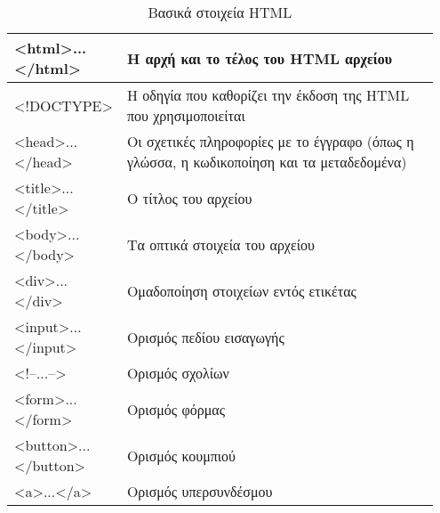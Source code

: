 \begin{table}[h]
\caption{Βασικά στοιχεία HTML}
\label{tbl:html_basic_elements}
\begin{tabular}{|p{0.2\linewidth}|p{0.75\linewidth}|}
\hline
\textless{}html\textgreater{}...\textless{}/html\textgreater{}     & Η αρχή και το τέλος του HTML αρχείου                                                      \\ \hline
\textless{}!DOCTYPE\textgreater{}                                  & Η οδηγία που καθορίζει την έκδοση της HTML που χρησιμοποιείται                            \\ \hline
\textless{}head\textgreater{}...\textless{}/head\textgreater{}     & Οι σχετικές πληροφορίες με το έγγραφο (όπως η γλώσσα, η κωδικοποίηση και τα μεταδεδομένα) \\ \hline
\textless{}title\textgreater{}...\textless{}/title\textgreater{}   & Ο τίτλος του αρχείου                                                                      \\ \hline
\textless{}body\textgreater{}...\textless{}/body\textgreater{}     & Τα οπτικά στοιχεία του αρχείου                                                            \\ \hline
\textless{}div\textgreater{}...\textless{}/div\textgreater{}       & Ομαδοποίηση στοιχείων εντός ετικέτας                                                      \\ \hline
\textless{}input\textgreater{}...\textless{}/input\textgreater{}   & Ορισμός πεδίου εισαγωγής                                                                  \\ \hline
\textless{}!--...--\textgreater{}                                  & Ορισμός σχολίων                                                                           \\ \hline
\textless{}form\textgreater{}...\textless{}/form\textgreater{}     & Ορισμός φόρμας                                                                            \\ \hline
\textless{}button\textgreater{}...\textless{}/button\textgreater{} & Ορισμός κουμπιού                                                                          \\ \hline
\textless{}a\textgreater{}...\textless{}/a\textgreater{}           & Ορισμός υπερσυνδέσμου                                                                     \\ \hline
\end{tabular}
\end{table}

